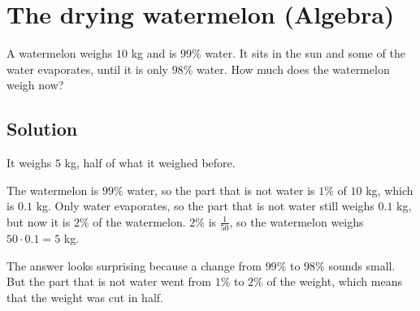 \section {The drying watermelon (Algebra)}

A watermelon weighs $10$ kg and is $99\%$ water.
It sits in the sun and some of the water evaporates, until it is only $98\%$ water.
How much does the watermelon weigh now?

\subsection{Solution}

It weighs $5$ kg, half of what it weighed before.

The watermelon is $99\%$ water, so the part that is not water is $1\%$ of $10$ kg, which is $0.1$ kg.
Only water evaporates, so the part that is not water still weighs $0.1$ kg, but now it is $2\%$ of the watermelon.
$2\%$ is $\frac{1}{50}$, so the watermelon weighs $50 \cdot 0.1 = 5$ kg.

The answer looks surprising because a change from $99\%$ to $98\%$ sounds small.
But the part that is not water went from $1\%$ to $2\%$ of the weight, which means that the weight was cut in half.
